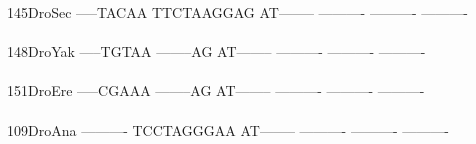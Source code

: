 \documentclass[11pt,twoside,reqno,a4paper]{article}
\begin{document}
{145\hspace*{2\charwidth}DroSec	-----TACAA	TTCTAAGGAG	AT--------	----------	----------	----------	\\
\hspace*{5\charwidth}\hspace*{7\charwidth}\hspace*{1\charwidth}\hspace*{1\charwidth}\hspace*{1\charwidth}\hspace*{1\charwidth}\hspace*{1\charwidth}\hspace*{1\charwidth}\\
148\hspace*{2\charwidth}DroYak	-----TGTAA	--------AG	AT--------	----------	----------	----------	\\
\hspace*{5\charwidth}\hspace*{7\charwidth}\hspace*{1\charwidth}\hspace*{1\charwidth}\hspace*{1\charwidth}\hspace*{1\charwidth}\hspace*{1\charwidth}\hspace*{1\charwidth}\\
151\hspace*{2\charwidth}DroEre	-----CGAAA	--------AG	AT--------	----------	----------	----------	\\
\hspace*{5\charwidth}\hspace*{7\charwidth}\hspace*{1\charwidth}\hspace*{1\charwidth}\hspace*{1\charwidth}\hspace*{1\charwidth}\hspace*{1\charwidth}\hspace*{1\charwidth}\\
109\hspace*{2\charwidth}DroAna	----------	TCCTAGGGAA	AT--------	----------	----------	----------	\\
\hspace*{5\charwidth}\hspace*{7\charwidth}\hspace*{1\charwidth}\hspace*{1\charwidth}\hspace*{1\charwidth}\hspace*{1\charwidth}\hspace*{1\charwidth}\hspace*{1\charwidth}\\
}
\end{document}
